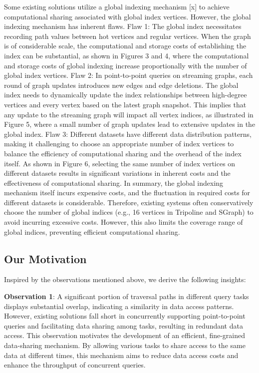 \documentclass[lettersize,journal]{IEEEtran} %
\begin{document}
Some existing solutions utilize a global indexing mechanism [x] to achieve computational sharing associated with global index vertices. However, the global indexing mechanism has inherent flaws. Flaw 1: The global index necessitates recording path values between hot vertices and regular vertices. When the graph is of considerable scale, the computational and storage costs of establishing the index can be substantial, as shown in Figures 3 and 4, where the computational and storage costs of global indexing increase proportionally with the number of global index vertices. Flaw 2: In point-to-point queries on streaming graphs, each round of graph updates introduces new edges and edge deletions. The global index needs to dynamically update the index relationships between high-degree vertices and every vertex based on the latest graph snapshot. This implies that any update to the streaming graph will impact all vertex indices, as illustrated in Figure 5, where a small number of graph updates lead to extensive updates in the global index. Flaw 3: Different datasets have different data distribution patterns, making it challenging to choose an appropriate number of index vertices to balance the efficiency of computational sharing and the overhead of the index itself. As shown in Figure 6, selecting the same number of index vertices on different datasets results in significant variations in inherent costs and the effectiveness of computational sharing. In summary, the global indexing mechanism itself incurs expensive costs, and the fluctuation in required costs for different datasets is considerable. Therefore, existing systems often conservatively choose the number of global indices (e.g., 16 vertices in Tripoline and SGraph) to avoid incurring excessive costs. However, this also limits the coverage range of global indices, preventing efficient computational sharing. 



\subsection{Our Motivation}
Inspired by the observations mentioned above, we derive the following insights:

{\bf{Observation 1}}: A significant portion of traversal paths in different query tasks displays substantial overlap, indicating a similarity in data access patterns. However, existing solutions fall short in concurrently supporting point-to-point queries and facilitating data sharing among tasks, resulting in redundant data access. This observation motivates the development of an efficient, fine-grained data-sharing mechanism. By allowing various tasks to share access to the same data at different times, this mechanism aims to reduce data access costs and enhance the throughput of concurrent queries.
\end{document}
